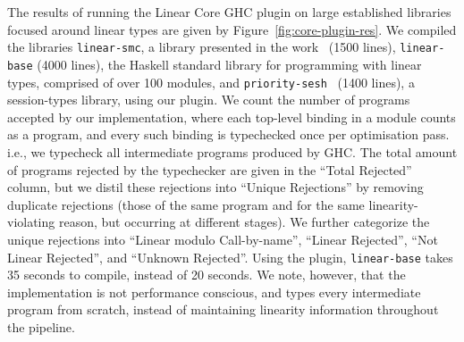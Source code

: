 \documentclass[acmsmall, screen, review]{acmart}
\begin{document}
The results of running the Linear Core GHC plugin on large established
libraries focused around linear types are given by
Figure~\ref{fig:core-plugin-res}.
%
We compiled the libraries \texttt{linear-smc}, a library presented in the
work~\cite{10.1145/3471874.3472980} (1500 lines), \texttt{linear-base} (4000
lines), the Haskell standard library for programming with linear types,
comprised of over 100 modules, and
\texttt{priority-sesh}~\cite{10.1145/3471874.3472979} (1400 lines), a
session-types library, using our plugin.
%
We count the number of programs accepted by our implementation, where each
top-level binding in a module counts as a program, and every such binding is
typechecked once per optimisation pass. i.e., we typecheck all intermediate
programs produced by GHC. The total amount of programs rejected by the
typechecker are given in the ``Total Rejected'' column, but we distil these
rejections into ``Unique Rejections'' by removing duplicate rejections (those
of the same program and for the same linearity-violating reason, but occurring
at different stages). We further categorize the unique rejections into ``Linear
modulo Call-by-name'', ``Linear Rejected'', ``Not Linear Rejected'', and
``Unknown Rejected''.
%
Using the plugin, \texttt{linear-base} takes 35 seconds to compile, instead of
20 seconds. We note, however, that the implementation is not performance
conscious, and types every intermediate program from scratch, instead of
maintaining linearity information throughout the pipeline.
\end{document}

